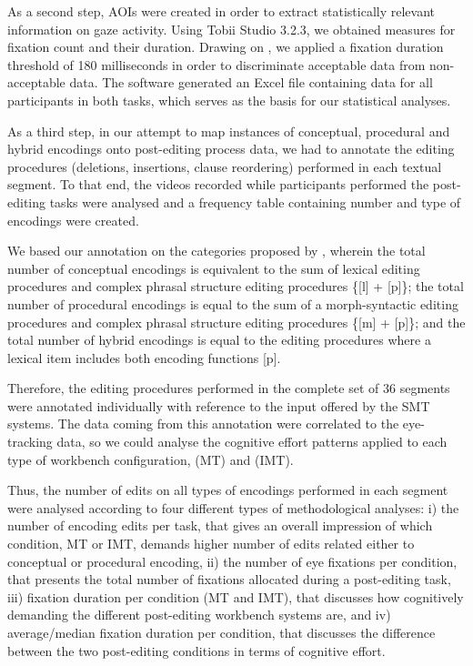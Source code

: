 \documentclass[output=paper]{langsci/langscibook}
\begin{document}
As a second step, AOIs were created in order to extract statistically relevant information on gaze activity. Using Tobii Studio 3.2.3, we obtained measures for fixation count and their duration. Drawing on \citet[p. 105]{Sjorup2013}, we applied a fixation duration threshold of 180 milliseconds in order to discriminate acceptable data from non-acceptable data. The software generated an Excel file containing data for all participants in both tasks, which serves as the basis for our statistical analyses.



As a third step, in our attempt to map instances of conceptual, procedural and hybrid encodings onto post-editing process data, we had to annotate the editing procedures (deletions, insertions, clause reordering) performed in each textual segment. To that end, the videos recorded while participants performed the post-editing tasks were analysed and a frequency table containing number and type of encodings were created. 



We based our annotation on the categories proposed by \citet{alves2013}, wherein the total number of conceptual encodings is equivalent to the sum of lexical editing procedures and complex phrasal structure editing procedures \{[l] + [p]\}; the total number of procedural encodings is equal to the sum of a morph-syntactic editing procedures and complex phrasal structure editing procedures \{[m] + [p]\}; and the total number of hybrid encodings is equal to the editing procedures where a lexical item includes both encoding functions [p]. 



Therefore, the editing procedures performed in the complete set of 36 segments were annotated individually with reference to the input offered by the SMT systems.  The data coming from this annotation were correlated to the eye-tracking data, so we could analyse the cognitive effort patterns applied to each type of workbench configuration, (MT) and (IMT). 



Thus, the number of edits on all types of encodings performed in each segment were analysed according to four different types of methodological analyses: i) the number of encoding edits per task, that gives an overall impression of which condition, MT or IMT, demands higher number of  edits related either to conceptual or procedural encoding, ii) the number of eye fixations per condition, that presents the total number of fixations allocated during a post-editing task, iii) fixation duration per condition (MT and IMT), that discusses how cognitively demanding the different post-editing workbench systems are, and iv) average/median fixation duration per condition, that discusses the difference between the two post-editing conditions in terms of cognitive effort.   
\end{document}
